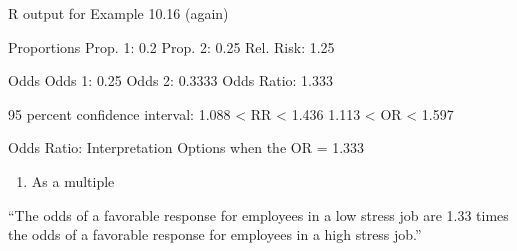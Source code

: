 \documentclass[12pt,ignorenonframetext,aspectratio=169]{beamer}
\def\tightlist{}
\newenvironment{Shaded}{\begin{snugshade}}{\end{snugshade}}
\newcommand{\DecValTok}[1]{\textcolor[rgb]{0.00,0.00,0.81}{{#1}}}
\newcommand{\FloatTok}[1]{\textcolor[rgb]{0.00,0.00,0.81}{{#1}}}
\newcommand{\StringTok}[1]{\textcolor[rgb]{0.31,0.60,0.02}{{#1}}}
\newcommand{\NormalTok}[1]{{#1}}
\begin{document}
\begin{frame}[fragile]{R output for Example 10.16 (again)}

\begin{Shaded}
\begin{Highlighting}[]
\NormalTok{Proportions}
       \NormalTok{Prop. }\DecValTok{1}\NormalTok{:}\StringTok{  }\FloatTok{0.2} 
       \NormalTok{Prop. }\DecValTok{2}\NormalTok{:}\StringTok{  }\FloatTok{0.25} 
     \NormalTok{Rel. Risk:}\StringTok{  }\FloatTok{1.25} 

\NormalTok{Odds}
        \NormalTok{Odds }\DecValTok{1}\NormalTok{:}\StringTok{  }\FloatTok{0.25} 
        \NormalTok{Odds }\DecValTok{2}\NormalTok{:}\StringTok{  }\FloatTok{0.3333} 
    \NormalTok{Odds Ratio:}\StringTok{  }\FloatTok{1.333} 

\DecValTok{95} \NormalTok{percent confidence interval:}
\StringTok{     }\FloatTok{1.088} \NormalTok{<}\StringTok{ }\NormalTok{RR <}\StringTok{ }\FloatTok{1.436} 
     \FloatTok{1.113} \NormalTok{<}\StringTok{ }\NormalTok{OR <}\StringTok{ }\FloatTok{1.597}
\end{Highlighting}
\end{Shaded}


\end{frame}

\begin{frame}{Odds Ratio: Interpretation Options when the OR = 1.333}

\begin{enumerate}
\def\labelenumi{\arabic{enumi}.}
\tightlist
\item
  As a multiple
\end{enumerate}

``The odds of a favorable response for employees in a low stress job are
1.33 times the odds of a favorable response for employees in a high
stress job.''


\end{frame}
\end{document}
